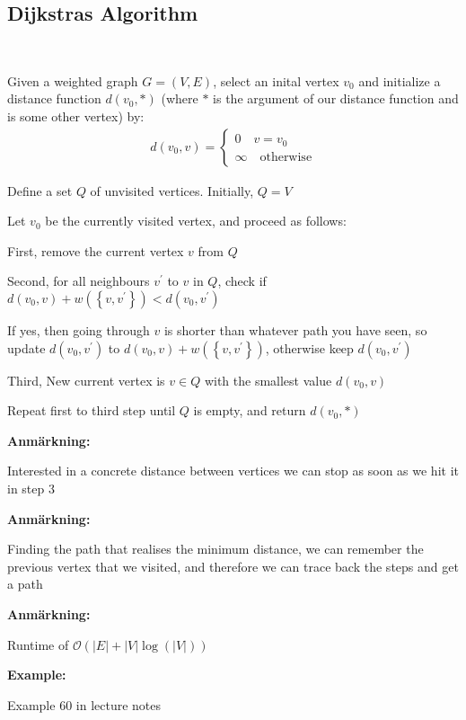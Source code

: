 \subsection{Dijkstras Algorithm}\hfill\\\par
\noindent Given a weighted graph $G = (V,E)$, select an inital vertex $v_0$ and initialize a distance function $d(v_0,*)$ (where $*$ is the argument of our distance function and is some other vertex)  by:
\begin{equation*}
  \begin{gathered}
    d(v_0,v) = \begin{cases}0\quad v = v_0\\\infty\quad\text{otherwise}\end{cases}
  \end{gathered}
\end{equation*}
\par\bigskip
\noindent Define a set $Q$ of unvisited vertices. Initially, $Q = V$ 
\par\bigskip
\noindent Let $v_0$ be the currently visited vertex, and proceed as follows:
\par\bigskip
\noindent First, remove the current vertex $v$ from $Q$
\par\bigskip
\noindent Second, for all neighbours $v^{\prime}$ to $v$ in $Q$, check if $d(v_0,v)+w(\left\{v,v^{\prime}\right\})< d(v_0,v^{\prime})$
\par\bigskip
\noindent If yes, then going through $v$ is shorter than whatever path you have seen, so update $d(v_0,v^{\prime})$ to $d(v_0,v)+w(\left\{v,v^{\prime}\right\})$, otherwise keep $d(v_0,v^{\prime})$
\par\bigskip
\noindent Third, New current vertex is $v\in Q$ with the smallest value $d(v_0,v)$
\par\bigskip
\noindent Repeat first to third step until $Q$ is empty, and return $d(v_0,*)$
\par\bigskip
\noindent\textbf{Anmärkning:}\par
\noindent Interested in a concrete distance between vertices we can stop as soon as we hit it in step 3
\par\bigskip
\noindent\textbf{Anmärkning:}\par
\noindent Finding the path that realises the minimum distance, we can remember the previous vertex that we visited, and therefore we can trace back the steps and get a path
\par\bigskip
\noindent\textbf{Anmärkning:}\par
\noindent Runtime of $\mathcal{O}(\left|E\right|+\left|V\right|\log(\left|V\right|))$
\par\bigskip
\noindent\textbf{Example:}\par
Example 60 in lecture notes
